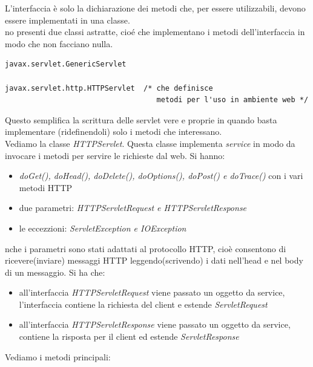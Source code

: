 \message{ !name(sd.tex)}\documentclass[a4paper,12pt, oneside]{book}
\begin{document}
L'interfaccia è solo la dichiarazione dei metodi che, per essere utilizzabili, devono essere implementati in una classe.\\
no presenti due classi astratte, cioé che implementano i metodi dell’interfaccia in modo che non facciano nulla. 
\begin{verbatim}
javax.servlet.GenericServlet 

javax.servlet.http.HTTPServlet  /* che definisce 
                                   metodi per l'uso in ambiente web */
\end{verbatim}
Questo semplifica la scrittura delle servlet vere e proprie in quando basta implementare (ridefinendoli) solo i metodi che interessano.\\
Vediamo la classe \textit{HTTPServlet}. Questa classe implementa \textit{service} in modo da invocare i metodi per servire le richieste dal web. Si hanno:
\begin{itemize}
	\item \textit{doGet(), doHead(), doDelete(), doOptions(), doPost() e doTrace()} con i vari metodi HTTP
	\item due parametri: \textit{HTTPServletRequest e HTTPServletResponse}
	\item le eccezzioni: \textit{ServletException e IOException}
\end{itemize}
nche i parametri sono stati adattati al protocollo HTTP, cioè consentono di ricevere(inviare) messaggi HTTP leggendo(scrivendo) i dati nell'head e nel body di un messaggio. Si ha che:
\begin{itemize}
	\item all'interfaccia \textit{HTTPServletRequest} viene passato un oggetto da service, l'interfaccia contiene la richiesta del client e estende \textit{ServletRequest}
	\item all'interfaccia \textit{HTTPServletResponse} viene passato un oggetto da service, contiene la risposta per il client ed estende \textit{ServletResponse}
\end{itemize}
Vediamo i metodi principali:
\end{document}
